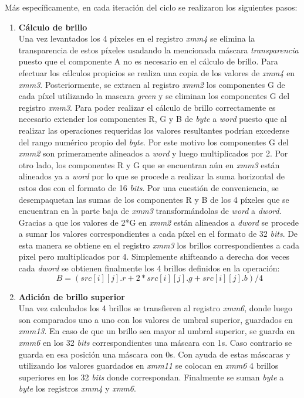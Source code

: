 \documentclass[a4paper]{article}
\begin{document}
\justify 
 Más específicamente, en cada iteración del ciclo se realizaron los siguientes pasos:
 
 \begin{enumerate}
 	\item \textbf{Cálculo de brillo}\\
 	Una vez levantados los 4 píxeles en el registro \textit{xmm4} se elimina la transparencia de estos píxeles usadando la mencionada máscara \textit{transparencia} puesto que el componente A no es necesario en el cálculo de brillo. Para efectuar los cálculos propicios se realiza una copia de los valores de \textit{xmm4} en \textit{xmm3}. Posteriormente, se extraen al registro \textit{xmm2} los componentes G de cada píxel utilizando la mascara \textit{green} y se eliminan los componentes G del registro \textit{xmm3}.
 	Para poder realizar el cálculo de brillo correctamente es necesario extender los componentes R, G y B de \textit{byte} a \textit{word} puesto que al realizar las operaciones requeridas los valores resultantes podrían excederse del rango numérico propio del \textit{byte}. Por este motivo los componentes G del \textit{xmm2} son primeramente alineados a \textit{word} y luego multiplicados por 2. Por otro lado, los componentes R y G que se encuentran aún en \textit{xmm3} están alineados ya a \textit{word} por lo que se procede a realizar la suma horizontal de estos dos con el formato de 16 \textit{bits}.
 	Por una cuestión de conveniencia, se desempaquetan las sumas de los componentes R y B de los 4 píxeles que se encuentran en la parte baja de \textit{xmm3} transformándolas de \textit{word} a \textit{dword}.  Gracias a que los valores de 2*G  en \textit{xmm2} están alineados a \textit{dword} se procede a sumar los valores correspondientes a cada píxel en el formato de 32 \textit{bits}. De esta manera se obtiene en el registro \textit{xmm3} los brillos correspondientes a cada pixel pero multiplicados por 4. Simplemente shifteando a derecha dos veces cada \textit{dword} se obtienen finalmente los 4 brillos definidos en la operación: 
 	 \begin{equation}
 	B = (src[i][j].r + 2 * src[i][j].g + src[i][j].b)/4 
 	\end{equation}
 	 
 
 	\item \textbf{Adición de brillo superior}\\
 	
	Una vez calculados los 4 brillos se transfieren al registro \textit{xmm6}, donde luego son comparados uno a uno con los valores de umbral superior, guardados en \textit{xmm13}. En caso de que un brillo sea mayor al umbral superior, se guarda en \textit{xmm6} en los 32 \textit{bits} correspondientes una máscara con 1s. Caso contrario se guarda en esa posición una máscara con 0s. Con ayuda de estas máscaras y utilizando los valores guardados en \textit{xmm11} se colocan en \textit{xmm6} 4 brillos superiores en los 32 \textit{bits} donde correspondan. Finalmente se suman \textit{byte} a \textit{byte} los registros \textit{xmm4} y \textit{xmm6}.
 	

\end{enumerate}
\end{document}
